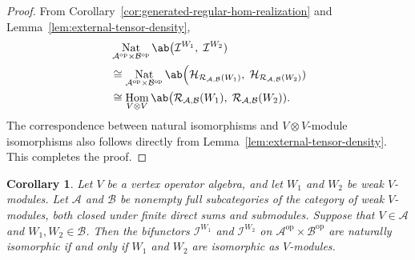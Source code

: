 \documentclass[12pt, english]{article}
\numberwithin{equation}{section}
\DeclareMathOperator{\Hom}{Hom}
\DeclareMathOperator{\opp}{op}
\DeclareMathOperator{\Nat}{Nat}
\theoremstyle{plain}
\newtheorem{corollary}[lemma]{Corollary}
\theoremstyle{definition}
\theoremstyle{remark}
\begin{document}
	\begin{proof}
		
		From Corollary~\ref{cor:generated-regular-hom-realization} and Lemma~\ref{lem:external-tensor-density},
		\begin{align*}
			& \Nat_{\mathcal{A}^{\opp}\times\mathcal{B}^{\opp}} \ab\big(\mathcal{I}^{W_1}, \; \mathcal{I}^{W_2}) \\
			& \cong \Nat_{\mathcal{A}^{\opp}\times\mathcal{B}^{\opp}} \ab\Big( \mathcal{H}_{\mathcal{R}_{ \mathcal{A}, \mathcal{B} }(W_1)}, \;
			\mathcal{H}_{\mathcal{R}_{ \mathcal{A}, \mathcal{B} }(W_2)} ) \\
			& \cong \Hom_{V \otimes V} \ab\big( \mathcal{R}_{ \mathcal{A}, \mathcal{B} }(W_1), \; \mathcal{R}_{ \mathcal{A}, \mathcal{B} }(W_2) ).\\
		\end{align*}
		The correspondence between natural isomorphisms and $V\otimes V$-module isomorphisms also follows directly from Lemma~\ref{lem:external-tensor-density}. This completes the proof.
	\end{proof}
	
	\begin{corollary}
		
		Let $V$ be a vertex operator algebra, and let $W_1$ and $W_2$ be weak $V$-modules.
		Let $\mathcal{A}$ and $\mathcal{B}$ be nonempty full subcategories of the category of weak $V$-modules, both closed under finite direct sums and submodules.
		Suppose that $V \in \mathcal{A}$ and $W_1, W_2 \in \mathcal{B}$.
		Then the bifunctors $\mathcal{I}^{W_1}$ and $\mathcal{I}^{W_2}$ on $\mathcal{A}^{\opp}\times\mathcal{B}^{\opp}$
		are naturally isomorphic if and only if $W_1$ and $W_2$ are isomorphic as $V$-modules.
		
	\end{corollary}
	
\end{document}
